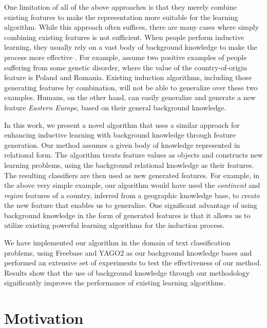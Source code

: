 \documentclass[twoside,11pt]{article}
\theoremstyle{definition}
\begin{document}
One limitation of all of the above approaches is that they merely combine existing features to make the representation more suitable for the 
learning algorithm.   While this approach often suffices, there are many cases where simply combining existing features is not sufficient.
When people perform inductive learning, they usually rely on a vast body of background knowledge to make the process more
effective \cite{mcnamara1996learning}. For example, assume two positive examples of people suffering from some genetic disorder, where the 
value of the country-of-origin feature is Poland and Romania.  Existing induction algorithms, including those generating features 
by combination, will not be able to generalize over these two examples.  Humans, on the other hand, can easily generalize 
and generate a new feature \emph{Eastern Europe}, based
on their general background knowledge.

In this work, we present a novel algorithm that uses a similar approach for enhancing inductive learning with background knowledge through feature generation.
Our method assumes a given body of knowledge represented in relational form.  The algorithm treats feature values as objects and constructs new learning problems, using the background relational knowledge as their features.  The resulting classifiers are then used as new generated features.
For example, in the above very simple example, our algorithm would have used the \emph{continent} and \emph{region} features of a country,
inferred from a geographic knowledge base, to create the new feature that enables us to generalize.  One significant advantage of
using background knowledge in the form of generated features is that it allows us to utilize existing powerful learning algorithms for the induction process.

We have implemented our algorithm in the domain of text classification problems, using Freebase and YAGO2 as our background knowledge bases 
and performed an extensive set of experiments to test the effectiveness of our method.  Results show that the use of background knowledge through our methodology significantly improves the performance of existing learning algorithms.

\section{Motivation} \label{motivation}
\end{document}
